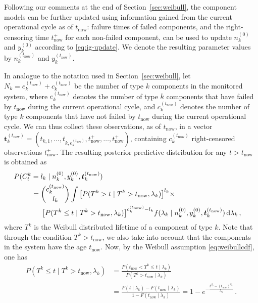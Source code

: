 \documentclass[authoryear]{elsarticle}
\newcommand{\dd}{\,\mathrm{d}}
\renewcommand{\vec}[1]{{\bm#1}}
\newcommand{\uz}{^{(0)}} %
\def\ykz{y\uz_k}
\def\nkz{n\uz_k}
\def\yknow{y_k^{(\tnow)}}
\def\nknow{n_k^{(\tnow)}}
\def\tnow{t_\text{now}}
\def\tpnow{t^+_\text{now}}
\def\eknow{e_k^{(\tnow)}}
\def\cknow{c_k^{(\tnow)}}
\def\vectknow{\vec{t}_k^{(\tnow)}}
\begin{document}
Following our comments at the end of Section~\ref{sec:weibull},
the component models can be further updated
using information gained from the current operational cycle as of $\tnow$: %
failure times of failed components,
and the right-censoring time $\tpnow$ for each non-failed component,
can be used to update $\nkz$ and $\ykz$ according to \eqref{eq:ig-update}.
We denote the resulting parameter values by $\nknow$ and $\yknow$.

In analogue to the notation used in Section~\ref{sec:weibull},
let $N_k = \eknow + \cknow$ be the number of type $k$ components in the monitored system,
where $\eknow$ denotes the number of type $k$ components that have failed by $\tnow$ during the current operational cycle,
and $\cknow$ denotes the number of type $k$ components that have not failed by $\tnow$ during the current operational cycle.
We can thus collect these observations, as of $\tnow$, in a vector
$\vectknow = (t_{k,1}, \ldots, t_{k,\eknow}, \tpnow, \ldots, \tpnow)$,
containing $\cknow$ right-censored observations $\tpnow$.
%
The resulting posterior predictive distribution for any $t > \tnow$ is obtained as
\begin{align}
\lefteqn{%
P(C^k_t = l_k\mid\nkz,\ykz, \vectknow) }\hspace*{5.75ex} \nonumber\\  %
 &= { \cknow \choose l_k} \int \big[P(T^k >    t \mid T^k > \tnow, \lambda_k)\big]^{l_k} \times \nonumber\\ & \hspace*{3.5ex}
                               \big[P(T^k \leq t \mid T^k > \tnow, \lambda_k)\big]^{\cknow - l_k}
    f(\lambda_k\mid\nkz,\ykz,\vectknow) \dd \lambda_k\,,
\label{eq:postpredtnow}
\end{align}
where $T^k$ is the Weibull distributed lifetime of a component of type $k$.
Note that through the condition $T^k > \tnow$, we also take into account
that the components in the system have the age $\tnow$.
Now, by the Weibull assumption \eqref{eq:weibullcdf}, one has
\begin{align}
P(T^k \leq t \mid T^k > \tnow, \lambda_k)
 &= \frac{P(\tnow < T^k \leq t \mid\lambda_k)}{P(T^k > \tnow \mid \lambda_k)} \nonumber\\
 &= \frac{F(t\mid\lambda_k) - F(\tnow\mid\lambda_k)}{1-F(\tnow\mid\lambda_k)} 
  = 1 - e^{-\frac{t^{\beta_k} - (\tnow)^{\beta_k}}{\lambda_k}}\,.
\label{eq:weibullcondprob}
\end{align}
\end{document}
